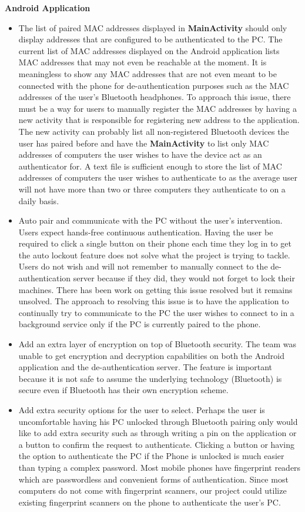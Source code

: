 \documentclass[letterpaper,twocolumn,10pt]{article}
\begin{document}
{{\hrulefill

\textbf{Android Application}
\begin{itemize}
\item The list of paired MAC addresses displayed in \textbf{MainActivity} should only display addresses that are configured to be authenticated to the PC. The current list of MAC addresses displayed on the Android application lists MAC addresses that may not even be reachable at the moment. It is meaningless to show any MAC addresses that are not even meant to be connected with the phone for de-authentication purposes such as the MAC addresses of the user's Bluetooth headphones. To approach this issue, there must be a way for users to manually register the MAC addresses by having a new activity that is responsible for registering new address to the application. The new activity can probably list all non-registered Bluetooth devices the user has paired before and have the \textbf{MainActivity} to list only MAC addresses of computers the user wishes to have the device act as an authenticator for. A text file is sufficient enough to store the list of MAC addresses of computers the user wishes to authenticate to as the average user will not have more than two or three computers they authenticate to on a daily basis.

\item Auto pair and communicate with the PC without the user's intervention. Users expect hands-free continuous authentication. Having the user be required to click a single button on their phone each time they log in to get the auto lockout feature does not solve what the project is trying to tackle. Users do not wish and will not remember to manually connect to the de-authentication server because if they did, they would not forget to lock their machines. There has been work on getting this issue resolved but it remains unsolved. The approach to resolving this issue is to have the application to continually try to communicate to the PC the user wishes to connect to in a background service only if the PC is currently paired to the phone.
\item  Add an extra layer of encryption on top of Bluetooth security. The team was unable to get encryption and decryption capabilities on both the Android application and the de-authentication server. The feature is important because it is not safe to assume the underlying technology (Bluetooth) is secure even if Bluetooth has their own encryption scheme.
\item Add extra security options for the user to select. Perhaps the user is uncomfortable having his PC unlocked through Bluetooth pairing only would like to add extra security such as through writing a pin on the application or a button to confirm the request to authenticate. Clicking a button or having the option to authenticate the PC if the Phone is unlocked is much easier than typing a complex password. Most mobile phones have fingerprint readers which are passwordless and convenient forms of authentication. Since most computers do not come with fingerprint scanners, our project could utilize existing fingerprint scanners on the phone to authenticate the user's PC.


\end{itemize}}}
\end{document}
